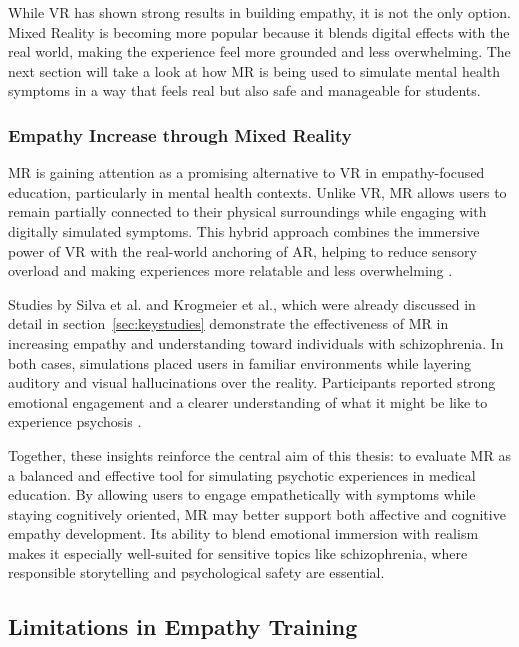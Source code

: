 \vspace{1em}

While VR has shown strong results in building empathy, it is not the only option. Mixed Reality is becoming more popular because it blends digital effects with the real world, making the experience feel more grounded and less overwhelming. The next section will take a look at how MR is being used to simulate mental health symptoms in a way that feels real but also safe and manageable for students.

\subsubsection{Empathy Increase through Mixed Reality}

MR is gaining attention as a promising alternative to VR in empathy-focused education, particularly in mental health contexts. Unlike VR, MR allows users to remain partially connected to their physical surroundings while engaging with digitally simulated symptoms. This hybrid approach combines the immersive power of VR with the real-world anchoring of AR, helping to reduce sensory overload and making experiences more relatable and less overwhelming \cite{Zare-Bidaki2022}.

Studies by Silva et al. and Krogmeier et al., which were already discussed in detail in section~\ref{sec:keystudies} demonstrate the effectiveness of MR in increasing empathy and understanding toward individuals with schizophrenia. In both cases, simulations placed users in familiar environments while layering auditory and visual hallucinations over the reality. Participants reported strong emotional engagement and a clearer understanding of what it might be like to experience psychosis \cite{Silva2017, Krogmeier2024}. 

\vspace{1em}

Together, these insights reinforce the central aim of this thesis: to evaluate MR as a balanced and effective tool for simulating psychotic experiences in medical education. By allowing users to engage empathetically with symptoms while staying cognitively oriented, MR may better support both affective and cognitive empathy development. Its ability to blend emotional immersion with realism makes it especially well-suited for sensitive topics like schizophrenia, where responsible storytelling and psychological safety are essential.

\subsection{Limitations in Empathy Training}
\label{sec:limitationsempathytraining}


